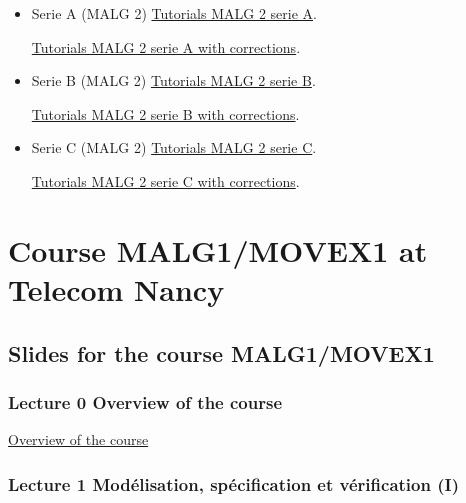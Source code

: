 \documentclass[ 12pt]{article}
\begin{document}
\begin{itemize}
  
  \item[]   Serie  A (MALG 2)
    \href{http://mery54.github.io/teaching/movex/lecturesnotes/malgserieA.pdf}{Tutorials 
      MALG 2        serie A}.

       \href{http://mery54.github.io/teaching/movex/lecturesnotes/cmalgserieA.pdf}{Tutorials 
      MALG 2        serie A with corrections}.

    \item[]   Serie  B (MALG 2)
    \href{http://mery54.github.io/teaching/movex/lecturesnotes/malgserieB.pdf}{Tutorials 
      MALG 2        serie B}.

       \href{http://mery54.github.io/teaching/movex/lecturesnotes/cmalgserieB.pdf}{Tutorials 
      MALG 2        serie B with corrections}.

     \item[]   Serie  C (MALG 2)
    \href{http://mery54.github.io/teaching/movex/lecturesnotes/malgserieC.pdf}{Tutorials 
      MALG 2        serie C}.

       \href{http://mery54.github.io/teaching/movex/lecturesnotes/cmalgserieC.pdf}{Tutorials 
      MALG 2        serie C with corrections}.

   \end{itemize}
  
  

\section{Course MALG1/MOVEX1 at Telecom Nancy}
\label{sec:course-mcfsi-at}


\subsection{Slides for the course MALG1/MOVEX1}
\label{sec:slides}


\subsubsection{Lecture 0 {Overview of the course }}
  
  \href{http://mery54.github.io/teaching/movex/lecturesnotes/movexlecture0.pdf}{Overview of the course }


\subsubsection{Lecture 1 {Mod\'elisation, 
    sp\'ecification et v\'erification}  (I) }
  
\end{document}
